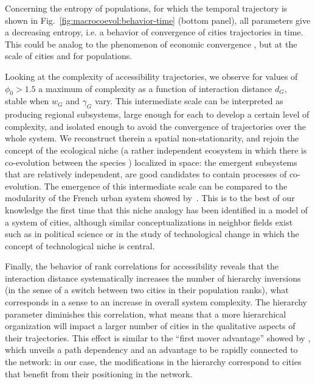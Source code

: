 \documentclass[11pt]{article}
\begin{document}
Concerning the entropy of populations, for which the temporal trajectory is shown in Fig.~\ref{fig:macrocoevol:behavior-time} (bottom panel), all parameters give a decreasing entropy, i.e. a behavior of convergence of cities trajectories in time. This could be analog to the phenomenon of economic convergence \citep{sachs1995economic}, but at the scale of cities and for populations.



Looking at the complexity of accessibility trajectories, we observe for values of $\phi_0 > 1.5$ a maximum of complexity as a function of interaction distance $d_G$, stable when $w_G$ and $\gamma_G$ vary. This intermediate scale can be interpreted as producing regional subsystems, large enough for each to develop a certain level of complexity, and isolated enough to avoid the convergence of trajectories over the whole system. We reconstruct therein a spatial non-stationarity, and rejoin the concept of the ecological niche (a rather independent ecosystem in which there is co-evolution between the species \citep{holland2012signals}) localized in space: the emergent subsystems that are relatively independent, are good candidates to contain processes of co-evolution. The emergence of this intermediate scale can be compared to the modularity of the French urban system showed by~\cite{berroir2017systemes}. This is to the best of our knowledge the first time that this niche analogy has been identified in a model of a system of cities, although similar conceptualizations in neighbor fields exist such as in political science \citep{monstadt2009conceptualizing} or in the study of technological change \citep{geels2005processes} in which the concept of technological niche is central.



Finally, the behavior of rank correlations for accessibility reveals that the interaction distance systematically increases the number of hierarchy inversions (in the sense of a switch between two cities in their population ranks), what corresponds in a sense to an increase in overall system complexity. The hierarchy parameter diminishes this correlation, what means that a more hierarchical organization will impact a larger number of cities in the qualitative aspects of their trajectories. This effect is similar to the ``first mover advantage'' showed by \cite{levinson2011does}, which unveils a path dependency and an advantage to be rapidly connected to the network: in our case, the modifications in the hierarchy correspond to cities that benefit from their positioning in the network.
\end{document}
